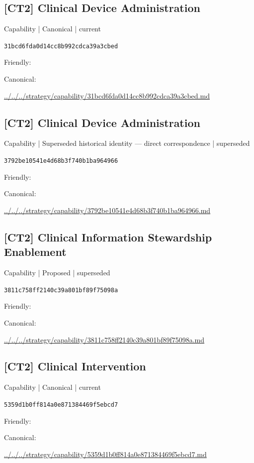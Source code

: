 \documentclass[10pt,a4paper]{article}
\begin{document}
\subsection*{[CT2] Clinical Device Administration}
{\small Capability | Canonical | current}\par
\texttt{31bcd6fda0d14cc8b992cdca39a3cbed}\par
Friendly: \par
Canonical: \par
{\footnotesize\url{../../../strategy/capability/31bcd6fda0d14cc8b992cdca39a3cbed.md}}\par
\subsection*{[CT2] Clinical Device Administration}
{\small Capability | Superseded historical identity — direct correspondence | superseded}\par
\texttt{3792be10541e4d68b3f740b1ba964966}\par
Friendly: \par
Canonical: \par
{\footnotesize\url{../../../strategy/capability/3792be10541e4d68b3f740b1ba964966.md}}\par
\subsection*{[CT2] Clinical Information Stewardship Enablement}
{\small Capability | Proposed | superseded}\par
\texttt{3811c758ff2140c39a801bf89f75098a}\par
Friendly: \par
Canonical: \par
{\footnotesize\url{../../../strategy/capability/3811c758ff2140c39a801bf89f75098a.md}}\par
\subsection*{[CT2] Clinical Intervention}
{\small Capability | Canonical | current}\par
\texttt{5359d1b0ff814a0e871384469f5ebcd7}\par
Friendly: \par
Canonical: \par
{\footnotesize\url{../../../strategy/capability/5359d1b0ff814a0e871384469f5ebcd7.md}}\par
\end{document}
